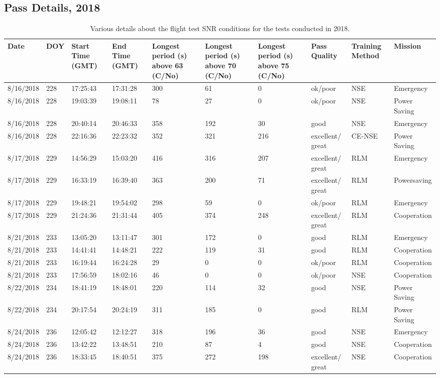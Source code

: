 \begin{landscape}
\chapter{Pass Details, 2018}\label{app:pass_details_2018}
\begin{table}[ht]
\centering
\caption{Various details about the flight test SNR conditions for the tests conducted in 2018.}
\begin{tabular}{ | m{0.8in} | m{0.5in}| m{0.8in} |  m{0.8in} | m{0.8in}| m{0.8in} | m{0.8in} | m{0.8in}| m{0.8in} | m{0.82in} |}
\hline
Date & DOY& Start Time (GMT) & End Time (GMT) & Longest period (s) above 63 (C/No) & Longest period (s) above 70 (C/No) & Longest period (s) above 75 (C/No) & Pass Quality & Training Method & Mission\\
\hline
\hline
8/16/2018 & 228 & 17:25:43 & 17:31:28 & 300 & 61 & 0 & ok/poor & NSE & Emergency\\\hline
8/16/2018 & 228 & 19:03:39 & 19:08:11 & 78 & 27 & 0 & ok/poor & NSE & Power Saving\\\hline
8/16/2018 & 228 & 20:40:14 & 20:46:33 & 358 & 192 & 30 & good & NSE & Emergency\\\hline
8/16/2018 & 228 & 22:16:36 & 22:23:32 & 352 & 321 & 216 & excellent/ great & CE-NSE & Power Saving\\\hline
8/17/2018&229&14:56:29&15:03:20&416&316&207&excellent/ great&RLM&Emergency\\\hline
8/17/2018&229&16:33:19&16:39:40&363&200&71&excellent/ great&RLM&Powersaving\\\hline
8/17/2018&229&19:48:21&19:54:02&298&59&0&ok/poor&RLM&Emergency\\\hline
8/17/2018&229&21:24:36&21:31:44&405&374&248&excellent/ great&RLM&Cooperation\\\hline
8/21/2018&233&13:05:20&13:11:47&301&172&0&good&RLM&Emergency\\\hline
8/21/2018&233&14:41:41&14:48:21&222&119&31&good&RLM&Cooperation\\\hline
8/21/2018&233&16:19:44&16:24:28&29&0&0&ok/poor&RLM&Cooperation\\\hline
8/21/2018&233&17:56:59&18:02:16&46&0&0&ok/poor&NSE&Cooperation\\\hline
8/22/2018&234&18:41:19&18:48:01&220&114&32&good&NSE&Power Saving\\\hline
8/22/2018&234&20:17:54&20:24:19&311&185&0&good&RLM&Power Saving\\\hline
8/24/2018&236&12:05:42&12:12:27&318&196&36&good&NSE&Emergency\\\hline
8/24/2018&236&13:42:22&13:48:51&210&87&4&good&NSE&Cooperation\\\hline
8/24/2018&236&18:33:45&18:40:51&375&272&198&excellent/ great&NSE&Cooperation\\
\hline
\end{tabular}

\end{table}
\end{landscape}



